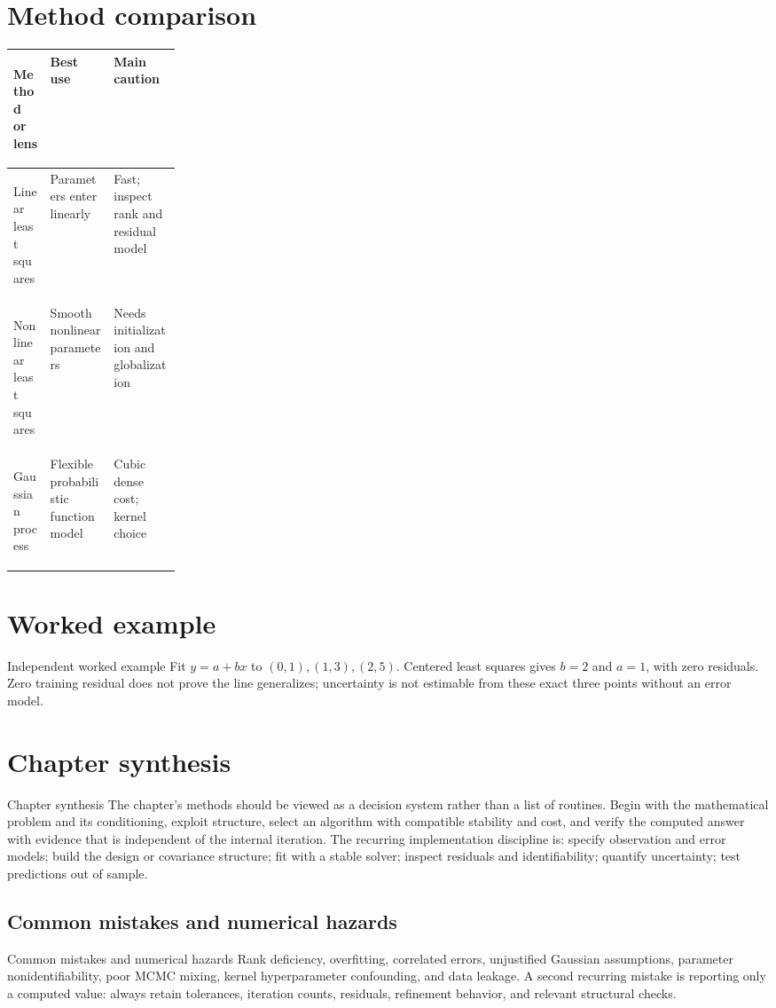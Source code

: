 \documentclass[10pt,letterpaper]{article}
\begin{document}
\section*{Method comparison}
\begin{center}
\small
\begin{tabularx}{\linewidth}{>{\bfseries\raggedright\arraybackslash}p{0.22\linewidth}XX}
\toprule
Method or lens & Best use & Main caution \\
\midrule
Linear least squares & Parameters enter linearly & Fast; inspect rank and residual model \\
Nonlinear least squares & Smooth nonlinear parameters & Needs initialization and globalization \\
Gaussian process & Flexible probabilistic function model & Cubic dense cost; kernel choice \\
\bottomrule
\end{tabularx}
\end{center}

\section*{Worked example}
\begin{exambox}{Independent worked example}
Fit $y=a+bx$ to $(0,1),(1,3),(2,5)$.  Centered least squares gives $b=2$ and $a=1$, with zero residuals.  Zero training residual does not prove the line generalizes; uncertainty is not estimable from these exact three points without an error model.
\end{exambox}

\section*{Chapter synthesis}
\begin{summarybox}{Chapter synthesis}
The chapter's methods should be viewed as a decision system rather than a list of routines.  Begin with the mathematical problem and its conditioning, exploit structure, select an algorithm with compatible stability and cost, and verify the computed answer with evidence that is independent of the internal iteration.  The recurring implementation discipline is: specify observation and error models; build the design or covariance structure; fit with a stable solver; inspect residuals and identifiability; quantify uncertainty; test predictions out of sample.
\end{summarybox}

\subsection*{Common mistakes and numerical hazards}
\begin{warnbox}{Common mistakes and numerical hazards}
Rank deficiency, overfitting, correlated errors, unjustified Gaussian assumptions, parameter nonidentifiability, poor MCMC mixing, kernel hyperparameter confounding, and data leakage.  A second recurring mistake is reporting only a computed value: always retain tolerances, iteration counts, residuals, refinement behavior, and relevant structural checks.
\end{warnbox}
\end{document}
